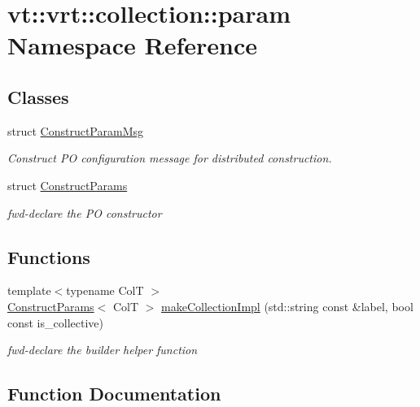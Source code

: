 \hypertarget{namespacevt_1_1vrt_1_1collection_1_1param}{}\section{vt\+:\+:vrt\+:\+:collection\+:\+:param Namespace Reference}
\label{namespacevt_1_1vrt_1_1collection_1_1param}
\subsection*{Classes}
\begin{DoxyCompactItemize}
\item 
struct \hyperlink{structvt_1_1vrt_1_1collection_1_1param_1_1_construct_param_msg}{Construct\+Param\+Msg}
\begin{DoxyCompactList}\small\item\em Construct PO configuration message for distributed construction. \end{DoxyCompactList}\item 
struct \hyperlink{structvt_1_1vrt_1_1collection_1_1param_1_1_construct_params}{Construct\+Params}
\begin{DoxyCompactList}\small\item\em fwd-\/declare the PO constructor \end{DoxyCompactList}\end{DoxyCompactItemize}
\subsection*{Functions}
\begin{DoxyCompactItemize}
\item 
{\footnotesize template$<$typename ColT $>$ }\\\hyperlink{structvt_1_1vrt_1_1collection_1_1param_1_1_construct_params}{Construct\+Params}$<$ ColT $>$ \hyperlink{namespacevt_1_1vrt_1_1collection_1_1param_a9cbe8ff9bad49fab6693d0fbe3064fc9}{make\+Collection\+Impl} (std\+::string const \&label, bool const is\+\_\+collective)
\begin{DoxyCompactList}\small\item\em fwd-\/declare the builder helper function \end{DoxyCompactList}\end{DoxyCompactItemize}


\subsection{Function Documentation}
\mbox{\label{namespacevt_1_1vrt_1_1collection_1_1param_a9cbe8ff9bad49fab6693d0fbe3064fc9}} 
